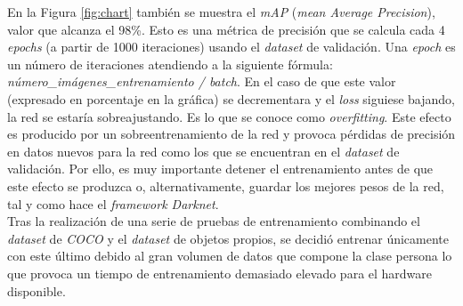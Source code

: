En la Figura \ref{fig:chart} también se muestra el \textit{mAP} (\textit{mean Average Precision}), valor que alcanza el 98\%. Esto es una métrica de precisión que se calcula cada 4 \textit{epochs} (a partir de 1000 iteraciones) usando el \textit{dataset} de validación. Una \textit{epoch} es un número de iteraciones atendiendo a la siguiente fórmula: \textit{número\_imágenes\_entrenamiento / batch}. En el caso de que este valor (expresado en porcentaje en la gráfica) se decrementara y el \textit{loss} siguiese bajando, la red se estaría sobreajustando. Es lo que se conoce como \textit{overfitting}. Este efecto es producido por un sobreentrenamiento de la red y provoca pérdidas de precisión en datos nuevos para la red como los que se encuentran en el \textit{dataset} de validación. Por ello, es muy importante detener el entrenamiento antes de que este efecto se produzca o, alternativamente, guardar los mejores pesos de la red, tal y como hace el \textit{framework Darknet}.\\

Tras la realización de una serie de pruebas de entrenamiento combinando el \textit{dataset} de \textit{COCO} y el \textit{dataset} de objetos propios, se decidió entrenar únicamente con este último debido al gran volumen de datos que compone la clase persona lo que provoca un tiempo de entrenamiento demasiado elevado para el hardware disponible.\\


